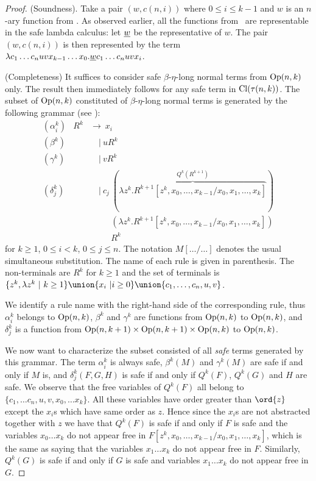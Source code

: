 \begin{proof}
  (Soundness). Take a pair $(w,c(n,i))$ where
  $0\leq i\leq k-1$ and $w$ is an $n$-ary function from \safedefset.
  As observed earlier, all the functions from \safedefset\ are representable
  in the safe lambda calculus: let $\underline{w}$ be the representative of $w$.
  The pair $(w,c(n,i))$ is then represented by the term
  $ \lambda c_1 \ldots c_n u v x_{k-1} \ldots x_0 . \underline{w} c_1\ldots c_n u v x_i$.
\smallskip

(Completeness) It suffices to consider safe $\beta$-$\eta$-long
normal terms from ${\rm Op}(n,k)$ only. The result then
immediately follows for any safe term in ${\rm Cl}(\tau(n,k))$. The
subset of ${\rm Op}(n,k)$ constituted of $\beta$-$\eta$-long
normal terms is generated by the following grammar (see
\cite{DBLP:journals/tcs/Zaionc87}):
\begin{eqnarray*}
  (\alpha_i^k) &R^k &\rightarrow\ x_i \\
  (\beta^k) && \quad|\  u R^k \\
  (\gamma^k) && \quad|\  v R^k \\
  (\delta^k_j) && \quad|\  c_j\ (\overbrace{\lambda z^k. R^{k+1}[z^k,x_0,\ldots, x_{k-1}/x_0,x_1, \ldots, x_k]}^{Q^k(R^{k+1})}) \\
  && \quad\  \quad \ (\lambda z^k. R^{k+1}[z^k,x_0,\ldots, x_{k-1}/x_0,x_1, \ldots, x_k]) \\
  && \quad\  \quad \ R^k
\end{eqnarray*}
for $k\geq 1$, $0\leq i< k$, $0\leq j\leq n$. The notation
$M[\ldots/\ldots]$ denotes the usual simultaneous substitution. The
name of each rule is given in parenthesis. The non-terminals are
$R^k$ for $k\geq1$ and the set of terminals is $\{ z^k, \lambda z^k
\ |\ k\geq 1\} \union \{ x_i ~| i\geq 0 \} \union \{ c_1, \ldots,
c_n, u, v \}$.

We identify a rule name with the right-hand side of the
corresponding rule, thus $\alpha_i^k$ belongs to ${\rm Op}(n,k)$,
$\beta^k$ and $\gamma^k$ are functions from ${\rm Op}(n,k)$ to
${\rm Op}(n,k)$, and $\delta^k_j$ is a function from
${\rm Op}(n,k+1) \times {\rm Op}(n,k+1) \times {\rm Op}(n,k)$
to ${\rm Op}(n,k)$.

We now want to characterize the subset consisted of all \emph{safe}
terms generated by this grammar. The term $\alpha_i^k$ is always
safe, $\beta^k(M)$ and $\gamma^k(M)$ are safe if and only if $M$ is,
and  $\delta^k_j(F,G,H)$ is safe if and only if $Q^k(F)$, $Q^k(G)$
and $H$ are safe. We observe that the free variables of $Q^k(F)$ all
belong to $\{ c_1, \ldots c_n, u, v, x_0,\ldots x_{k}\}$. All these
variables have order greater than $\ord{z}$ except the $x_i$s which
have same order as $z$. Hence since the $x_i$s are not abstracted
together with $z$ we have that $Q^k(F)$ is safe if and only if $F$
is safe and the variables $x_0\ldots x_k$ do not appear free in
$F[z^k,x_0,\ldots, x_{k-1}/x_0,x_1, \ldots, x_k]$, which is the same
as saying that the variables $x_1\ldots x_k$ do not appear free in
$F$. Similarly, $Q^k(G)$ is safe if and only if $G$ is safe and
variables $x_1\ldots x_k$ do not appear free in $G$.


\end{proof}
